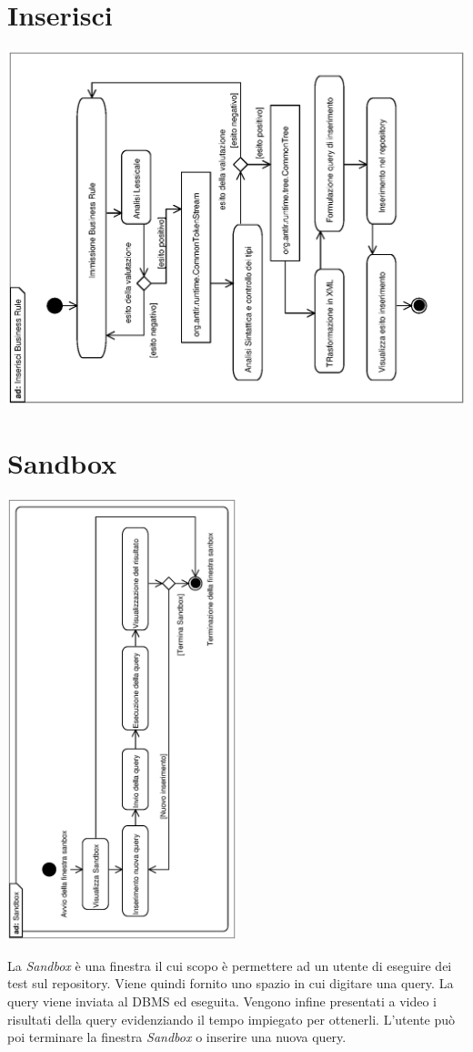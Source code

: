 \documentclass[11pt,titlepage,a4paper]{report}
\begin{document}
\section{Inserisci \br}
\begin{center}
 \includegraphics[width=1\textwidth, angle=-90]{InserisciBusinessRule.eps}
\end{center}


\section{Sandbox}
\begin{center}
 \includegraphics[width=0.5\textwidth, angle=-90]{Sandbox.eps}
\end{center}
La \textit{Sandbox} \`e una finestra il cui scopo \`e permettere ad un utente di eseguire dei test sul repository. Viene quindi fornito uno spazio in cui digitare una query. La query viene inviata al DBMS ed eseguita. Vengono infine presentati a video i risultati della query evidenziando il tempo impiegato per ottenerli. L'utente pu\`o poi terminare la finestra \textit{Sandbox} o inserire una nuova query.
\end{document}
